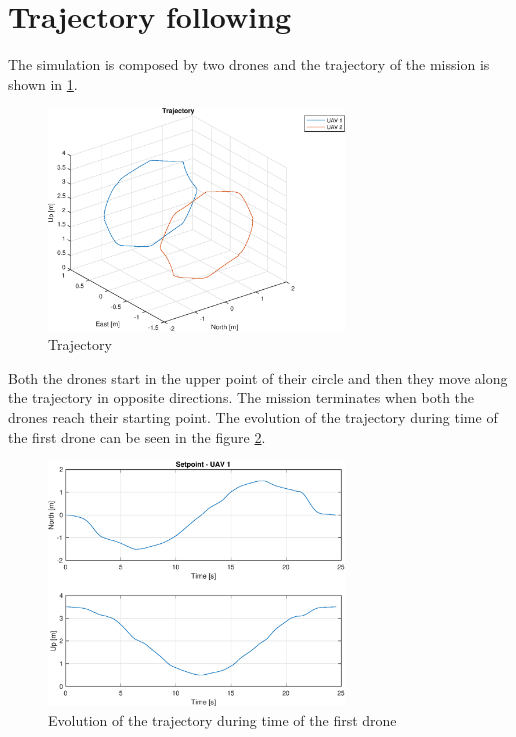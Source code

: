 \section{Trajectory following}

The simulation is composed by two drones and the trajectory of the mission is shown
in \ref{fig:trajectory}.

\begin{figure}
\centering
\includegraphics[width=0.7\textwidth]{chapters/chapter-04/figures/trajectory.eps}
\caption{Trajectory}
\label{fig:trajectory}
\end{figure}

Both the drones start in the upper point of their circle and then they move along the
trajectory in opposite directions. The mission terminates when both the drones reach
their starting point.
The evolution of the trajectory during time of the first drone can be seen in the figure
\ref{fig:trajectory_during_time}.

\begin{figure}
\centering
\includegraphics[width=0.7\textwidth]{chapters/chapter-04/figures/pos.eps}
\caption{Evolution of the trajectory during time of the first drone}
\label{fig:trajectory_during_time}
\end{figure}

